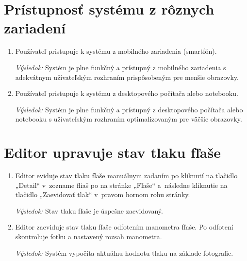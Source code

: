 \documentclass{zah}
\begin{document}
\section{Prístupnosť systému z rôznych zariadení}

\begin{enumerate}
	\item Používateľ pristupuje k systému z mobilného zariadenia (smartfón).
		
	\textit{Výsledok:} Systém je plne funkčný a prístupný z mobilného zariadenia s adekvátnym užívateľským rozhraním prispôsobeným pre menšie obrazovky.
	
	\item Používateľ pristupuje k systému z desktopového počítača alebo notebooku.
		
	\textit{Výsledok:} Systém je plne funkčný a prístupný z desktopového počítača alebo notebooku s užívateľským rozhraním optimalizovaným pre väčšie obrazovky.
\end{enumerate}

\section{Editor upravuje stav tlaku fľaše}

\begin{enumerate}
	\item Editor eviduje stav tlaku fľaše manuálnym zadaním po kliknutí na tlačidlo „Detail“ v zozname fliaš po na stránke „Fľaše“ a následne kliknutie na tlačidlo „Zaevidovať tlak“ v pravom hornom rohu stránky.
	
	\textit{Výsledok:} Stav tlaku fľaše je úspešne zaevidovaný.

	\item Editor zaeviduje stav tlaku fľaše odfotením manometra fľaše. Po odfotení skontroluje fotku a nastavený rozsah manometra.

	\textit{Výsledok:} Systém vypočíta aktuálnu hodnotu tlaku na základe fotografie.
\end{enumerate}
\end{document}
